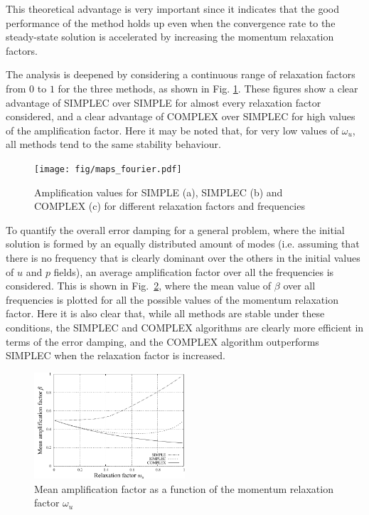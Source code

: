 \documentclass[final,3p,times,11pt,onecolumn]{myElsarticle}
\numberwithin{equation}{section}
\begin{document}
This theoretical advantage is very important since it indicates that the good performance of the method holds up even when the convergence rate to the steady-state solution is accelerated by increasing the momentum relaxation factors. 

The analysis is deepened by considering a continuous range of relaxation factors from $0$ to $1$ for the three methods, as shown in Fig. \ref{fig:1c}. These figures show a clear advantage of SIMPLEC over SIMPLE for almost every relaxation factor considered, and a clear advantage of COMPLEX over SIMPLEC for high values of the amplification factor. Here it may be noted that, for very low values of $\omega_u$, all methods tend to the same stability behaviour.
\begin{figure}[b!]
    \centering
    \texttt{[image: fig/maps\_fourier.pdf]}
    \caption{Amplification values for SIMPLE (a), SIMPLEC (b) and COMPLEX (c) for different relaxation factors and frequencies}
    \label{fig:1c}
\end{figure}    
    
To quantify the overall error damping for a general problem, where the initial solution is formed by an equally distributed amount of modes (i.e. assuming that there is no frequency that is clearly dominant over the others in the initial values of $u$ and $p$ fields), an average amplification factor over all the frequencies is considered. This is shown in Fig.~\ref{fig:1d}, where the mean value of $\beta$ over all frequencies is plotted for all the possible values of the momentum relaxation factor. Here it is also clear that, while all methods are stable under these conditions, the SIMPLEC and COMPLEX algorithms are clearly more efficient in terms of the error damping, and the COMPLEX algorithm outperforms SIMPLEC when the relaxation factor is increased. 

\begin{figure}[t!]
    \centering
    \includegraphics[width=0.5\textwidth]{fig/meanAmp.pdf}
    \caption{Mean amplification factor as a function of the momentum relaxation factor $\omega_u$}
    \label{fig:1d}
\end{figure}  
\end{document}

